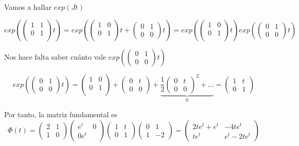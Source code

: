 \documentclass{mathnotes}
\begin{document}
\begin{example}
Vamos a hallar $exp(Jt)$
\begin{center}
$exp(\begin{pmatrix}
1 & 1\\0 & 1\\
\end{pmatrix}t) = exp(\begin{pmatrix}
1 & 0\\ 0 & 1\\
\end{pmatrix}t+\begin{pmatrix}
0 & 1\\ 0 & 0
\end{pmatrix}t) = exp(\begin{pmatrix}
1 & 0\\ 0 & 1\\
\end{pmatrix}t)exp(\begin{pmatrix}
0 & 1\\ 0 & 0
\end{pmatrix}t)$
\end{center}

Nos hace falta saber cuánto vale $exp(\begin{pmatrix}
0 & 1\\ 0 & 0
\end{pmatrix}t)$

$$exp(\begin{pmatrix}
0 & 1\\ 0 & 0
\end{pmatrix}t) = \begin{pmatrix}
1 & 0 \\ 0 & 1\\
\end{pmatrix} + \begin{pmatrix}
0 & t \\ 0 & 0 
\end{pmatrix} + \underbrace{\frac{1}{2}\begin{pmatrix}
0 & t \\ 0 & 0
\end{pmatrix}^2 + \hdots}_0 = \begin{pmatrix}
1 & t\\ 0 & 1
\end{pmatrix}$$

Por tanto, la matriz fundamental es
$$\Phi(t) = \begin{pmatrix}
2 & 1\\1  & 0
\end{pmatrix}\begin{pmatrix}
e^t & 0\\ 0 e^t
\end{pmatrix}\begin{pmatrix}
1 & t\\ 0 & 1
\end{pmatrix}\begin{pmatrix}
0 & 1\\1 & -2
\end{pmatrix} = \begin{pmatrix}
2te^t+e^t & -4te^t\\te^t& e^t-2te^t
\end{pmatrix}$$
\end{example}
\end{document}
